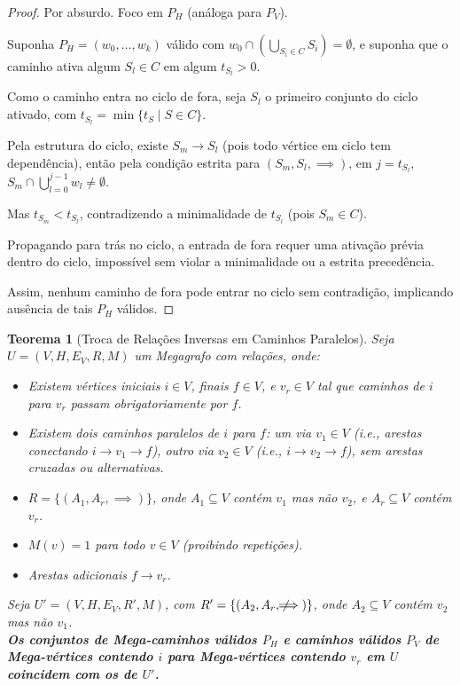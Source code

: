 \documentclass{article}
\newtheorem{theorem}{Teorema}
\begin{document}
\begin{proof}
Por absurdo. Foco em \( P_H \) (análoga para \( P_V \)).

Suponha \( P_H = (w_0, \dots, w_k) \) válido com \( w_0 \cap \left( \bigcup_{S_i \in C} S_i \right) = \emptyset \), e suponha que o caminho ativa algum \( S_l \in C \) em algum \( t_{S_l} > 0 \).

Como o caminho entra no ciclo de fora, seja \( S_l \) o primeiro conjunto do ciclo ativado, com \( t_{S_l} = \min \{ t_S \mid S \in C \} \).

Pela estrutura do ciclo, existe \( S_m \to S_l \) (pois todo vértice em ciclo tem dependência), então pela condição estrita para \( (S_m, S_l, \implies) \), em \( j = t_{S_l} \), \( S_m \cap \bigcup_{l=0}^{j-1} w_l \neq \emptyset \).

Mas \( t_{S_m} < t_{S_l} \), contradizendo a minimalidade de \( t_{S_l} \) (pois \( S_m \in C \)).

Propagando para trás no ciclo, a entrada de fora requer uma ativação prévia dentro do ciclo, impossível sem violar a minimalidade ou a estrita precedência.

Assim, nenhum caminho de fora pode entrar no ciclo sem contradição, implicando ausência de tais \( P_H \) válidos.
\end{proof}

\newpage
\begin{theorem}[Troca de Relações Inversas em Caminhos Paralelos]
\hfill

Seja \( U = (V, H, E_V, R, M) \) um Megagrafo com relações, onde:

\begin{itemize}
    \item Existem vértices iniciais \( i \in V \), finais \( f \in V \), e \( v_r \in V \) tal que caminhos de \( i \) para \( v_r \) passam obrigatoriamente por \( f \).
    \item Existem dois caminhos paralelos de \( i \) para \( f \): um via \( v_1 \in V \) (i.e., arestas conectando \( i \to v_1 \to f \)), outro via \( v_2 \in V \) (i.e., \( i \to v_2 \to f \)), sem arestas cruzadas ou alternativas.
    \item \( R = \{ (A_1, A_r, \implies) \} \), onde \( A_1 \subseteq V \) contém \( v_1 \) mas não \( v_2 \), e \( A_r \subseteq V \) contém \( v_r \).
    \item \( M(v) = 1 \) para todo \( v \in V \) (proibindo repetições).
    \item Arestas adicionais \( f \to v_r \).
\end{itemize}

Seja \( U' = (V, H, E_V, R', M) \), com \( R' = \{ (A_2, A_r, \not\!\!\!\implies) \} \), onde \( A_2 \subseteq V \) contém \( v_2 \) mas não \( v_1 \).
\\

\textbf{Os conjuntos de Mega-caminhos válidos \( P_H \) e caminhos válidos \( P_V \) de Mega-vértices contendo \( i \) para Mega-vértices contendo \( v_r \) em \( U \) coincidem com os de \( U' \).}
\end{theorem}
\end{document}
